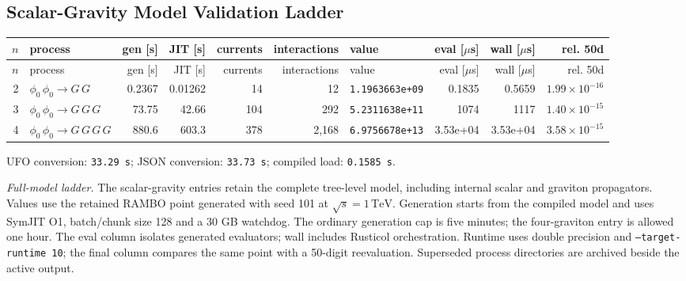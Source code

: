 \subsection*{Scalar-Gravity Model Validation Ladder}
\begingroup
\scriptsize
\setlength{\tabcolsep}{4pt}
\renewcommand{\arraystretch}{1.12}
\begin{longtable}{@{}rL{2.35in}rrrrL{0.78in}rrr@{}}
\toprule
$n$ & process & gen [s] & JIT [s] & currents & interactions & value & eval [$\mu$s] & wall [$\mu$s] & rel. 50d \\
\midrule
\endfirsthead
\toprule
$n$ & process & gen [s] & JIT [s] & currents & interactions & value & eval [$\mu$s] & wall [$\mu$s] & rel. 50d \\
\midrule
{} & $\phi_0\,\phi_0\to G\,G$ & 0.2367 & 0.01262 & 14 & 12 & \texttt{1.1963663e+09} & 0.1835 & 0.5659 & $1.99\times10^{-16}$ \\
3 & $\phi_0\,\phi_0\to G\,G\,G$ & 73.75 & 42.66 & 104 & 292 & \texttt{5.2311638e+11} & 1074 & 1117 & $1.40\times10^{-15}$ \\
4 & $\phi_0\,\phi_0\to G\,G\,G\,G$ & 880.6 & 603.3 & 378 & 2,168 & \texttt{6.9756678e+13} & 3.53e+04 & 3.53e+04 & $3.58\times10^{-15}$ \\
\bottomrule
\end{longtable}
\noindent UFO conversion: \texttt{33.29 s}; \quad JSON conversion: \texttt{33.73 s}; \quad compiled load: \texttt{0.1585 s}.

\par\smallskip
\noindent\textit{Full-model ladder.} The scalar-gravity entries retain the complete tree-level model, including internal scalar and graviton propagators.
 Values use the retained RAMBO point generated with seed 101 at $\sqrt{s}=1\,\mathrm{TeV}$. Generation starts from the compiled model and uses SymJIT O1, batch/chunk size 128 and a 30 GB watchdog.
 The ordinary generation cap is five minutes; the four-graviton entry is allowed one hour.
 The eval column isolates generated evaluators; wall includes Rusticol orchestration. Runtime uses double precision and \texttt{--target-runtime 10}; the final column compares the same point with a 50-digit reevaluation. Superseded process directories are archived beside the active output.
\endgroup
